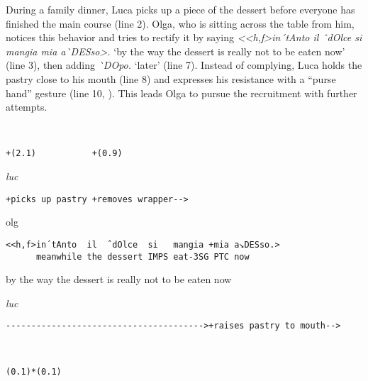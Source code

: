 \documentclass[output=paper,modfonts]{langscibook}
\begin{document}
During a family dinner, Luca picks up a piece of the dessert before everyone has finished the main course (line 2). Olga, who is sitting across the table from him, notices this behavior and tries to rectify it by saying \textit{<{}<h,f>in´{}tAnto il ˆ{}dOlce si mangia mia a\`{}DESso>.} ‘by the way the dessert is really not to be eaten now’ (line 3), then adding \textit{\`{}DOpo.} ‘later’ (line 7). Instead of complying, Luca holds the pastry close to his mouth (line 8) and expresses his resistance with a “purse hand” gesture (line 10, ). This leads Olga to pursue the recruitment with further attempts.

\vspace{2mm}
%
\begin{transbox}{1}{~}
\begin{verbatim}
+(2.1)           +(0.9)
\end{verbatim}
\end{transbox}
%
\begin{transbox}{2}{\textit{luc}}
\begin{verbatim}
+picks up pastry +removes wrapper--> 
\end{verbatim}
\end{transbox}
%
\begin{mdframednoverticalspace}[style=firstfoc]
\begin{transbox}{3}{olg}
\begin{verbatim}
<<h,f>in´tAnto  il  ˆdOlce  si   mangia +mia a↘DESso.>
      meanwhile the dessert IMPS eat-3SG PTC now
\end{verbatim}
\hspace{0.8cm} by the way the dessert is really not to be eaten now
\end{transbox}
\end{mdframednoverticalspace}\vspace{1mm}
%
\begin{transbox}{4}{\textit{luc}}
\begin{verbatim}
--------------------------------------->+raises pastry to mouth-->
\end{verbatim}
\end{transbox}\vspace{-1mm}
%
\begin{transbox}{5}{~}
\begin{verbatim}
(0.1)*(0.1)
\end{verbatim}
\end{transbox}\vspace{-1mm}
\end{document}
